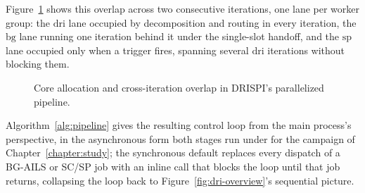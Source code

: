 Figure~\ref{fig:pipeline-swimlane} shows this overlap across two consecutive iterations, one lane per worker group: the $\mathrm{dri}$ lane occupied by decomposition and routing in every iteration, the $\mathrm{bg}$ lane running one iteration behind it under the single-slot handoff, and the $\mathrm{sp}$ lane occupied only when a trigger fires, spanning several $\mathrm{dri}$ iterations without blocking them.

\begin{figure}[H]
\centering
{}
\caption{Core allocation and cross-iteration overlap in DRISPI's parallelized pipeline.}
\label{fig:pipeline-swimlane}
\end{figure}

Algorithm~\ref{alg:pipeline} gives the resulting control loop from the main process's perspective, in the asynchronous form both stages run under for the campaign of Chapter~\ref{chapter:study}; the synchronous default replaces every dispatch of a BG-AILS or SC/SP job with an inline call that blocks the loop until that job returns, collapsing the loop back to Figure~\ref{fig:dri-overview}'s sequential picture.

